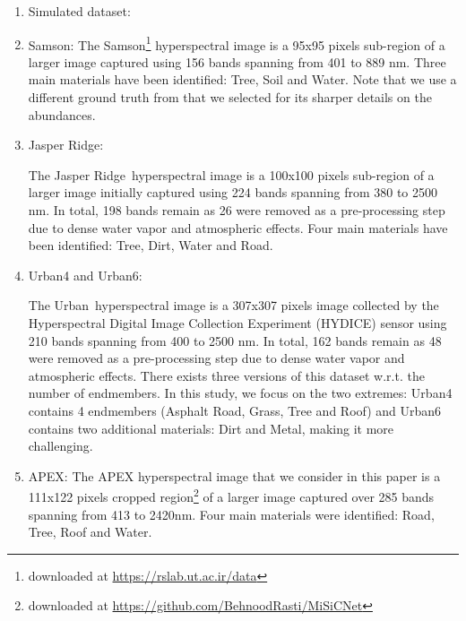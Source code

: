 \begin{enumerate}

\item Simulated dataset:

\item Samson: 
  The Samson\footnote{downloaded at \href{https://rslab.ut.ac.ir/data}{https://rslab.ut.ac.ir/data}} hyperspectral
image is a 95x95 pixels sub-region of a larger image captured using 156 bands spanning from 401 to 889 nm.
Three main materials have been identified: Tree, Soil and Water.
Note that we use a different ground truth from \cite{rasti_misicnet_2022} that we selected for its sharper details on the abundances.

\item Jasper Ridge:
\addtocounter{footnote}{-1}
The Jasper Ridge\footnotemark~hyperspectral
image is a 100x100 pixels sub-region of a larger image initially captured
using 224 bands spanning from 380 to 2500 nm.
In total, 198 bands remain as 26 were removed as a pre-processing step due to
dense water vapor and atmospheric effects.
Four main materials have been identified: Tree, Dirt, Water and Road.

\item Urban4 and Urban6:
\addtocounter{footnote}{-1}
The Urban\footnotemark~hyperspectral image is a 307x307 pixels image collected by the
Hyperspectral Digital Image Collection Experiment (HYDICE) \cite{rickard_hydice_1993} sensor using
210 bands spanning from 400 to 2500 nm.
In total, 162 bands remain as 48 were removed as a pre-processing step due to
dense water vapor and atmospheric effects.
There exists three versions of this dataset w.r.t. the number of endmembers.
In this study, we focus on the two extremes: Urban4 contains 4 endmembers
(Asphalt Road, Grass, Tree and Roof) and
Urban6 contains two additional materials: Dirt and Metal, making it more challenging.

\item APEX:
The APEX \cite{schaepman_advanced_2015} hyperspectral image that we consider in
this paper is a 111x122 pixels cropped region\footnote{downloaded at \href{https://github.com/BehnoodRasti/MiSiCNet}{https://github.com/BehnoodRasti/MiSiCNet}} of a larger image captured over
285 bands spanning from 413 to 2420nm.
Four main materials were identified: Road, Tree, Roof and Water.



\end{enumerate}
